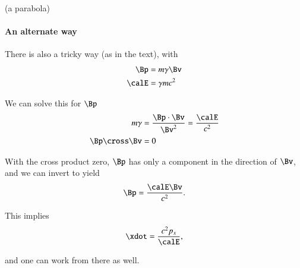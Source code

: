 {(a parabola)

\paragraph{An alternate way}

There is also a tricky way (as in the text), with
%
\begin{equation}\label{eqn:relativisticElectrodynamicsT3:160}
\begin{aligned}
\Bp &= m \gamma \Bv  \\
\calE &= \gamma m c^2
\end{aligned}
\end{equation}

We can solve this for \(\Bp\)
%
\begin{equation}\label{eqn:relativisticElectrodynamicsT3:1010}
\begin{aligned}
m \gamma &= \frac{\Bp \cdot \Bv}{\Bv^2} = \frac{\calE}{c^2} \\
\Bp \cross \Bv &= 0
\end{aligned}
\end{equation}

With the cross product zero, \(\Bp\) has only a component in the direction of \(\Bv\), and we can invert to yield
%
\begin{equation}\label{eqn:relativisticElectrodynamicsT3:180}
\Bp = \frac{\calE \Bv}{c^2}.
\end{equation}

This implies
%
\begin{equation}\label{eqn:relativisticElectrodynamicsT3:200}
\xdot = \frac{c^2 p_x}{\calE},
\end{equation}

and one can work from there as well.

} %
